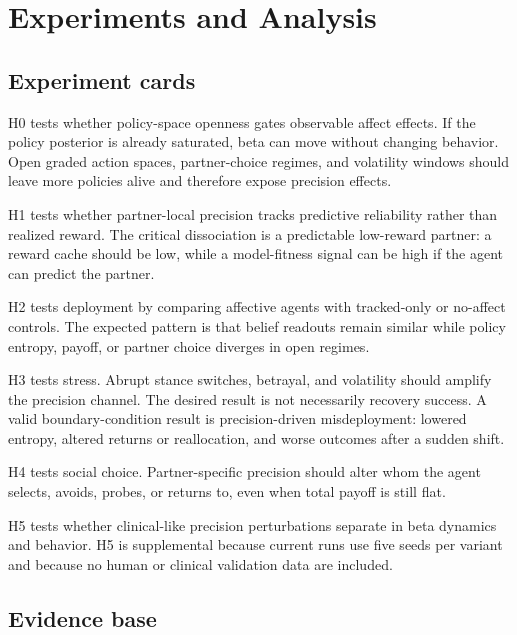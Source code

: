 \section{Experiments and Analysis}

\subsection{Experiment cards}

H0 tests whether policy-space openness gates observable affect effects. If the policy posterior is already saturated, beta can move without changing behavior. Open graded action spaces, partner-choice regimes, and volatility windows should leave more policies alive and therefore expose precision effects.

H1 tests whether partner-local precision tracks predictive reliability rather than realized reward. The critical dissociation is a predictable low-reward partner: a reward cache should be low, while a model-fitness signal can be high if the agent can predict the partner.

H2 tests deployment by comparing affective agents with tracked-only or no-affect controls. The expected pattern is that belief readouts remain similar while policy entropy, payoff, or partner choice diverges in open regimes.

H3 tests stress. Abrupt stance switches, betrayal, and volatility should amplify the precision channel. The desired result is not necessarily recovery success. A valid boundary-condition result is precision-driven misdeployment: lowered entropy, altered returns or reallocation, and worse outcomes after a sudden shift.

H4 tests social choice. Partner-specific precision should alter whom the agent selects, avoids, probes, or returns to, even when total payoff is still flat.

H5 tests whether clinical-like precision perturbations separate in beta dynamics and behavior. H5 is supplemental because current runs use five seeds per variant and because no human or clinical validation data are included.

\subsection{Evidence base}

